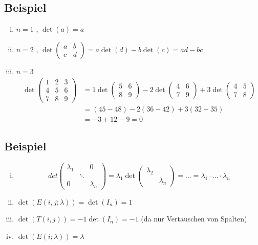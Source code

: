 \subsection{Beispiel} %
\label{sub:beispiel}
\begin{enumerate}[(i)]
	\item $n=1$ , $\det(a)=a$
	\item $n=2$ , $\det( \begin{smallmatrix}
		a & b \\
		c & d
	\end{smallmatrix}) = a \det (d) - b \det (c) = ad -bc$
	\item $n=3$
	\begin{align*}
		\det \begin{pmatrix}
			1 & 2 & 3 \\
			4 & 5 & 6 \\
			7 & 8 & 9
		\end{pmatrix} &= 1 \det \begin{pmatrix}
			5 & 6 \\
			8 & 9
		\end{pmatrix} - 2 \det \begin{pmatrix}
			4 & 6 \\
			7 & 9
		\end{pmatrix} + 3 \det \begin{pmatrix}
			4 & 5 \\
			7 & 8
		\end{pmatrix} \\
		&= (45-48)- 2(36 -42)+ 3(32 - 35) \\
		&= -3 + 12 -9 = 0
	\end{align*}
\end{enumerate}

\subsection{Beispiel} %
\label{sub:beispiel}
\begin{enumerate}[(i)]
	\item
	\[
		det \begin{pmatrix}
			\lambda_1 & & 0 \\
			& \ddots & \\
			0 & & \lambda_n
		\end{pmatrix} = \lambda_1 \det \begin{pmatrix}
			\lambda_2 & \\
			& \lambda_n
		\end{pmatrix} = \ldots = \lambda_1 \cdot \ldots \cdot \lambda_n
	\]
	\item $\det (E(i,j; \lambda )) = \det (I_n) = 1$
	\item $\det ( T(i,j)) = -1 \det ( I_n) = -1$ (da nur Vertauschen von Spalten)
	\item $\det(E(i; \lambda )) = \lambda $
\end{enumerate}

